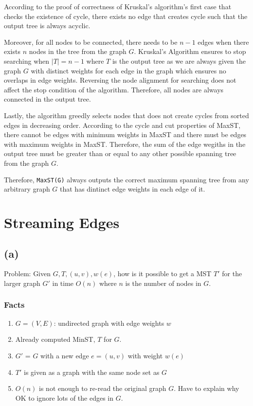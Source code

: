 \documentclass[11pt]{article}
\begin{document}
According to the proof of correctness of Kruskal's algorithm's first
case that checks the existence of cycle, there exists no edge that
creates cycle such that the output tree is always acyclic.

Moreover, for all nodes to be connected, there needs to be \(n-1\) edges
when there exists \(n\) nodes in the tree from the graph \(G\).
Kruskal's Algorithm ensures to stop searching when \(|T| = n-1\) where
\(T\) is the output tree as we are always given the graph \(G\) with
distinct weights for each edge in the graph which ensures no overlaps in
edge weights. Reversing the node alignment for searching does not affect
the stop condition of the algorithm. Therefore, all nodes are always
connected in the output tree.

Lastly, the algorithm greedly selects nodes that does not create cycles
from sorted edges in decreasing order. According to the cycle and cut
properties of MaxST, there cannot be edges with minimum weights in MaxST
and there must be edges with maximum weights in MaxST. Therefore, the
sum of the edge wegiths in the output tree must be greater than or equal
to any other possible spanning tree from the graph \(G\).

Therefore, \texttt{MaxST(G)} always outputs the correct maximum spanning
tree from any arbitrary graph \(G\) that has dintinct edge weights in
each edge of it.

\hypertarget{streaming-edges}{%
\section{Streaming Edges}\label{streaming-edges}}

\hypertarget{a}{%
\subsection{(a)}\label{a}}

Problem: Given \(G, T, (u,v), w(e)\), how is it possible to get a MST
\(T'\) for the larger graph \(G'\) in time \(O(n)\) where \(n\) is the
number of nodes in \(G\).

\hypertarget{facts}{%
\subsubsection{Facts}\label{facts}}

\begin{enumerate}
\def\labelenumi{\arabic{enumi}.}
\item
  \(G = (V,E)\): undirected graph with edge weights \(w\)
\item
  Already computed MinST, \(T\) for \(G\).
\item
  \(G'\) = \(G\) with a new edge \(e = (u,v)\) with weight \(w(e)\)
\item
  \(T'\) is given as a graph with the same node set as \(G\)
\item
  \(O(n)\) is not enough to re-read the original graph \(G\). Have to
  explain why OK to ignore lots of the edges in \(G\).
\end{enumerate}
\end{document}
